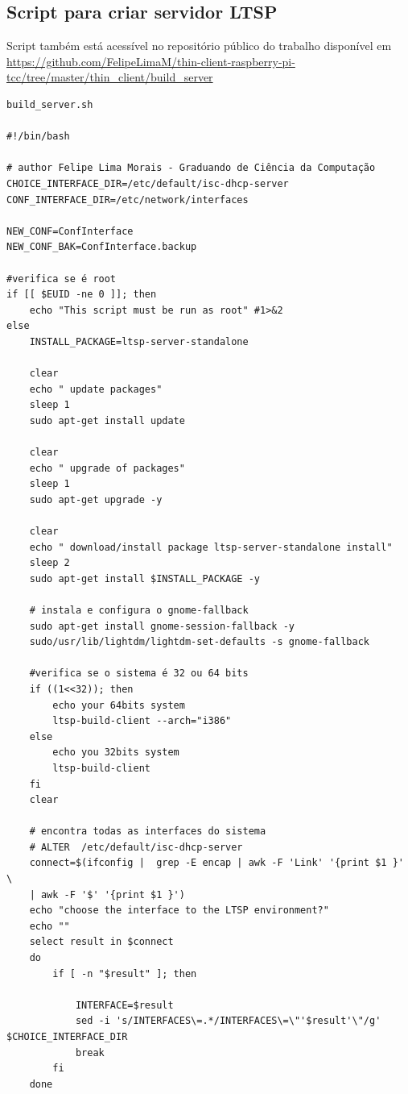 \documentclass[
	12pt,				%
	openright,			%
	twoside,			%
	a4paper,			%
	chapter=TITLE,		%
	english,			%
	brazil				%
	]{abntex2}
\begin{document}
\begin{apendicesenv}

\partapendices

\chapter{Script para criar servidor LTSP}
\label{script:servidor}
Script também está acessível no repositório público do trabalho disponível em	 \url{https://github.com/FelipeLimaM/thin-client-raspberry-pi-tcc/tree/master/thin_client/build_server}

\begin{verbatim}
build_server.sh

#!/bin/bash

# author Felipe Lima Morais - Graduando de Ciência da Computação
CHOICE_INTERFACE_DIR=/etc/default/isc-dhcp-server
CONF_INTERFACE_DIR=/etc/network/interfaces

NEW_CONF=ConfInterface
NEW_CONF_BAK=ConfInterface.backup

#verifica se é root
if [[ $EUID -ne 0 ]]; then
    echo "This script must be run as root" #1>&2
else
    INSTALL_PACKAGE=ltsp-server-standalone
    
    clear
    echo " update packages"
    sleep 1
    sudo apt-get install update

    clear
    echo " upgrade of packages"
    sleep 1
    sudo apt-get upgrade -y 

    clear
    echo " download/install package ltsp-server-standalone install"
    sleep 2
    sudo apt-get install $INSTALL_PACKAGE -y

	# instala e configura o gnome-fallback
	sudo apt-get install gnome-session-fallback -y
	sudo/usr/lib/lightdm/lightdm-set-defaults -s gnome-fallback

	#verifica se o sistema é 32 ou 64 bits
    if ((1<<32)); then
        echo your 64bits system
        ltsp-build-client --arch="i386" 
    else
        echo you 32bits system
        ltsp-build-client
    fi
	clear
	
	# encontra todas as interfaces do sistema
	# ALTER  /etc/default/isc-dhcp-server
	connect=$(ifconfig |  grep -E encap | awk -F 'Link' '{print $1 }' \
	| awk -F '$' '{print $1 }')
	echo "choose the interface to the LTSP environment?"
	echo ""	
	select result in $connect
	do
		if [ -n "$result" ]; then	
			
			INTERFACE=$result
			sed -i 's/INTERFACES\=.*/INTERFACES\=\"'$result'\"/g' $CHOICE_INTERFACE_DIR	
			break
		fi
	done


\end{verbatim}
\end{apendicesenv}
\end{document}
